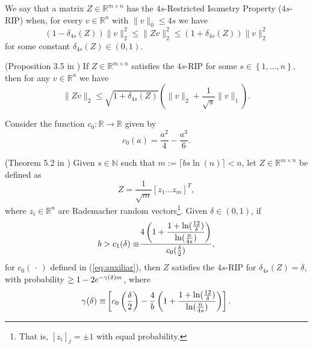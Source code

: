 \noindent We say that a matrix $Z\in\mathbb{R}^{m\times n}$ has the $4s$-Restricted Isometry Property ($4s$-RIP) when, for every $v\in\mathbb{R}^{n}$ with $\|v\|_{0}\leq 4s$ we have
\begin{equation*}
\left(1-\delta_{4s}(Z)\right)\|v\|_{2}^{2}\leq\|Zv\|_{2}^{2}\leq \left(1+\delta_{4s}(Z)\right)\|v\|_{2}^{2}
\end{equation*}
for some constant $\delta_{4s}(Z)\in (0,1)$. 

\begin{lemma}(Proposition 3.5 in \cite{needell2009cosamp}) If $Z\in\mathbb{R}^{m\times n}$ satisfies the $4s$-RIP for some $s\in\left\{1,\ldots,n\right\}$, then for any $v\in\mathbb{R}^{n}$ we have
\begin{equation*}
\|Zv\|_{2}\leq\sqrt{1+\delta_{4s}(Z)}\left(\|v\|_{2}+\frac{1}{\sqrt{s}}\|v\|_{1}\right).
\end{equation*}
\label{lem:Y}
\end{lemma}
Consider the function $c_{0}:\mathbb{R}\to\mathbb{R}$ given by
\begin{equation}
c_{0}(a)=\dfrac{a^{2}}{4}-\frac{a^{3}}{6}.
\label{eq:auxiliar}
\end{equation}

\begin{lemma} (Theorem 5.2 in \cite{baraniuk2008simple}) Given $s\in\mathbb{N}$ such that $m:=\lceil b s\ln(n)\rceil<n$, let $Z\in\mathbb{R}^{m\times n}$ be defined as
\begin{equation*}
Z=\frac{1}{\sqrt{m}}\left[z_{1}\ldots z_{m}\right]^{T},
\end{equation*}
where $z_{i}\in\mathbb{R}^{n}$ are Rademacher random vectors\footnote{That is, $[z_i]_j = \pm 1$ with equal probability.}. Given $\delta\in (0,1)$, if 
\begin{equation}
b>\textcolor{black}{c_{1}(\delta)\equiv}\dfrac{4\left(1+\dfrac{1+\ln(\frac{12}{\delta})}{\ln(\frac{n}{4s})}\right)}{c_{0}(\frac{\delta}{2})},
\label{eq:revision1}
\end{equation}
for $c_{0}(\,\cdot\,)$ defined in (\ref{eq:auxiliar}), then $Z$ satisfies the $4s$-RIP for $\delta_{4s}(Z)=\delta$, with probability $\geq 1-2e^{\textcolor{black}{-\gamma(\delta)} m}$, where 
\begin{equation}
    \textcolor{black}{\gamma(\delta)\equiv}\left[c_{0}\left(\frac{\delta}{2}\right)-\frac{4}{b}\left(1+\dfrac{1+\ln(\frac{12}{\delta})}{\ln(\frac{n}{4s})}\right)\right].
    \label{eq:revision2}
\end{equation}
\label{lem:new}    
\end{lemma}

